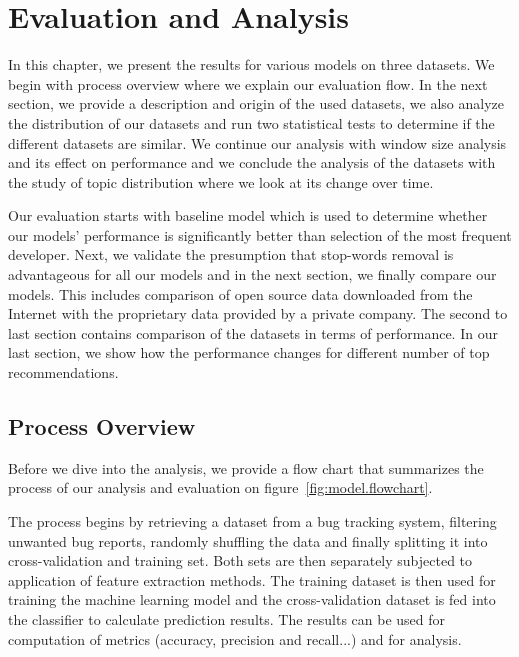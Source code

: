 \chapter{Evaluation and Analysis}
\label{chapter:evaluation}

In this chapter, we present the results for various models on three datasets. We begin with process overview where we explain our evaluation flow. In the next section, we provide a description and origin of the used datasets, we also analyze the distribution of our datasets and run two statistical tests to determine if the different datasets are similar. We continue our analysis with window size analysis and its effect on performance and we conclude the analysis of the datasets with the study of topic distribution where we look at its change over time. 

Our evaluation starts with baseline model which is used to determine whether our models' performance is significantly better than selection of the most frequent developer. Next, we validate the presumption that stop-words removal is advantageous for all our models and in the next section, we finally compare our models. This includes comparison of open source data downloaded from the Internet with the proprietary data provided by a private company. The second to last section contains comparison of the datasets in terms of performance. In our last section, we show how the performance changes for different number of top recommendations.

\section{Process Overview}

Before we dive into the analysis, we provide a flow chart that summarizes the process of our analysis and evaluation on figure~\ref{fig:model.flowchart}.

The process begins by retrieving a dataset from a bug tracking system, filtering unwanted bug reports, randomly shuffling the data and finally splitting it into cross-validation and training set. Both sets are then separately subjected to application of feature extraction methods. The training dataset is then used for training the machine learning model and the cross-validation dataset is fed into the classifier to calculate prediction results. The results can be used for computation of metrics (accuracy, precision and recall...) and for analysis.


